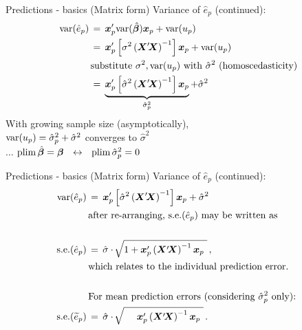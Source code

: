 \documentclass{beamer}
\begin{document}

\begin{frame}{Predictions - basics (Matrix form)}
Variance of $\hat{e}_p$ (continued):
\begin{equation*}
\begin{aligned}
\textnormal{var}(\hat{e}_p) \,&=\,
  \bm{x}_{p}^\prime \textnormal{var}(\hat{\bm{\beta}})\bm{x}_{p} + \textnormal{var}(u_p)\\
 \,&=\,
   \bm{x}_{p}^\prime \left[ \sigma^2 \left( \bm{X}^\prime \! \bm{X}  \right)^{-1} \right] \bm{x}_{p} + \textnormal{var}(u_p)\\
   & \textnormal{substitute $\sigma^2, \textnormal{var}(u_p)$ with $\hat{\sigma}^2$ (homoscedasticity)}\\
  \,&=\,
   \underbrace{\bm{x}_{p}^\prime \left[ \hat{\sigma}^2 \left( \bm{X}^\prime \! \bm{X}  \right)^{-1} \right] \bm{x}_{p}}_{\hat{\sigma}_p^2}
   + \hat{\sigma}^2
\end{aligned}
\end{equation*}
With growing sample size (asymptotically), \\
$\textnormal{var}(u_p) = \hat{\sigma}_p^2 + \hat{\sigma}^2$ converges to $\hat{\sigma}^2$\\
$\dots$ $\textnormal{plim} \, \hat{\bm{\beta}} = \bm{\beta} \,\,\,\, \leftrightarrow \,\,\,\, 
  \textnormal{plim} \, \hat{\sigma}_p^2 = 0$

\end{frame}

\begin{frame}{Predictions - basics (Matrix form)}
Variance of $\hat{e}_p$ (continued):
\begin{equation*}
\begin{aligned}
\textnormal{var}(\hat{e}_p) \,&=\,
\bm{x}_{p}^\prime \left[ \hat{\sigma}^2 \left( \bm{X}^\prime \! \bm{X}  \right)^{-1} \right] \bm{x}_{p}
   + \hat{\sigma}^2\\
   & \textnormal{after re-arranging, $\textnormal{s.e.}(\hat{e}_p)$ may be written as}\\
   &~\\
   \textnormal{s.e.}(\hat{e}_p) \,&=\, \hat{\sigma} \cdot \,  
   \sqrt[]{1+ \bm{x}_{p}^\prime \left( \bm{X}^\prime \! \bm{X}  \right)^{-1} \bm{x}_{p}~} \,,\\
   &\textnormal{which relates to the individual prediction error. }\\~&~\\
   &\textnormal{For mean prediction errors (considering $\hat{\sigma}_p^2$ only): }\\
   \textnormal{s.e.}(\widetilde{e}_p) \,&=\, \hat{\sigma} \cdot \,  
   \sqrt[]{~~~~ \bm{x}_{p}^\prime \left( \bm{X}^\prime \! \bm{X}  \right)^{-1} \bm{x}_{p}~} \,.\\
\end{aligned}
\end{equation*}

\end{frame}
\end{document}
